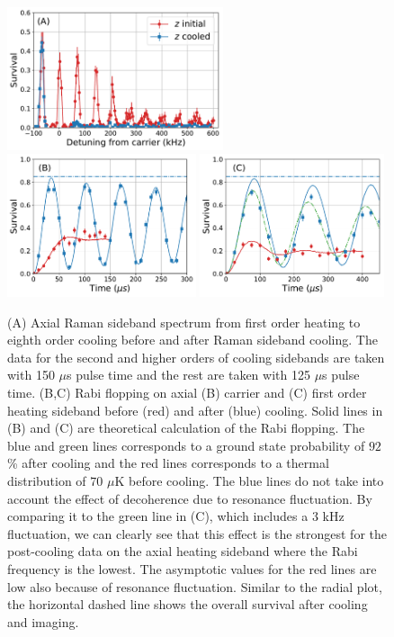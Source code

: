 \documentclass[aps,prl,twocolumn,groupedaddress]{revtex4-1}
\begin{document}
\begin{figure}
  \includegraphics[height=4.2cm]{imgs/spectrum_a1.pdf}
  \includegraphics[height=4.2cm]{imgs/rabi_flop_a1_0.pdf}
  \includegraphics[height=4.2cm]{imgs/rabi_flop_a1_p1.pdf}
  \caption{(A) Axial Raman sideband spectrum from first order heating to eighth order cooling
    before and after Raman sideband cooling.
    The data for the second and higher orders of cooling sidebands are taken with 150 $\mu$s
    pulse time and the rest are taken with 125 $\mu$s pulse time.
    (B,C) Rabi flopping on axial (B) carrier and (C) first order heating sideband
    before (red) and after (blue) cooling.
    Solid lines in (B) and (C) are theoretical calculation of the Rabi flopping.
    The blue and green lines corresponds to a ground state probability of $92$\% after cooling and
    the red lines corresponds to a thermal distribution of $70$ $\mu$K before cooling.
    The blue lines do not take into account the effect of decoherence due to resonance
    fluctuation. By comparing it to the green line in (C), which includes a $3$ kHz fluctuation,
    we can clearly see that this effect is the strongest for the post-cooling data on
    the axial heating sideband where the Rabi frequency is the lowest.
    The asymptotic values for the red lines are low also because of resonance fluctuation.
    Similar to the radial plot,
    the horizontal dashed line shows the overall survival after cooling and imaging.
    \label{f-axial}}
\end{figure}
\end{document}
